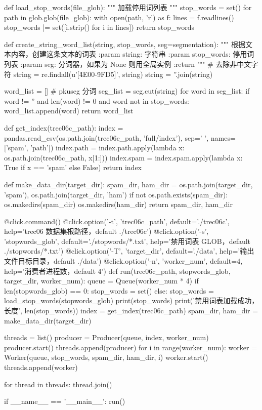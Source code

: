\documentclass[UTF8,zihao=-4]{ctexart}
\begin{document}
\begin{python}
def load_stop_words(file_glob):
    """
    加载停用词列表
    """
    stop_words = set()
    for path in glob.glob(file_glob):
        with open(path, 'r') as f:
            lines = f.readlines()
        stop_words |= set([i.strip() for i in lines])
    return stop_words


def create_string_word_list(string, stop_words, seg=segmentation):
    """
    根据文本内容，创建这条文本的词表
    :param string: 字符串
    :param stop_words: 停用词列表
    :param seg: 分词器，如果为 None 则用全局实例
    :return
    """
    # 去除非中文字符
    string = re.findall(u'[\u4E00-\u9FD5]', string)
    string = ''.join(string)

    word_list = []
    # pkuseg 分词
    seg_list = seg.cut(string)
    for word in seg_list:
        if word != '' and len(word) != 0 and word not in stop_words:
            word_list.append(word)
    return word_list


def get_index(trec06c_path):
    index = pandas.read_csv(os.path.join(trec06c_path, 'full/index'), sep=' ', names=['spam', 'path'])
    index.path = index.path.apply(lambda x: os.path.join(trec06c_path, x[1:]))
    index.spam = index.spam.apply(lambda x: True if x == 'spam' else False)
    return index


def make_data_dir(target_dir):
    spam_dir, ham_dir = os.path.join(target_dir, 'spam'), os.path.join(target_dir, 'ham')
    if not os.path.exists(spam_dir):
        os.makedirs(spam_dir)
        os.makedirs(ham_dir)
    return spam_dir, ham_dir


@click.command()
@click.option('-t', 'trec06c_path', default='./trec06c', help='trec06 数据集根路径，default ./trec06c')
@click.option('-s', 'stopwords_glob', default='./stopwords/*.txt', help='禁用词表 GLOB，default ./stopwords/*.txt')
@click.option('-T', 'target_dir', default='./data', help='输出文件目标目录，default ./data')
@click.option('-n', 'worker_num', default=4, help='消费者进程数，default 4')
def run(trec06c_path, stopwords_glob, target_dir, worker_num):
    queue = Queue(worker_num * 4)
    if len(stopwords_glob) == 0:
        stop_words = set()
    else:
        stop_words = load_stop_words(stopwords_glob)
    print(stop_words)
    print('禁用词表加载成功，长度', len(stop_words))
    index = get_index(trec06c_path)
    spam_dir, ham_dir = make_data_dir(target_dir)

    threads = list()
    producer = Producer(queue, index, worker_num)
    producer.start()
    threads.append(producer)
    for i in range(worker_num):
        worker = Worker(queue, stop_words, spam_dir, ham_dir, i)
        worker.start()
        threads.append(worker)

    for thread in threads:
        thread.join()


if __name__ == '__main__':
    run()
\end{python}
\end{document}
